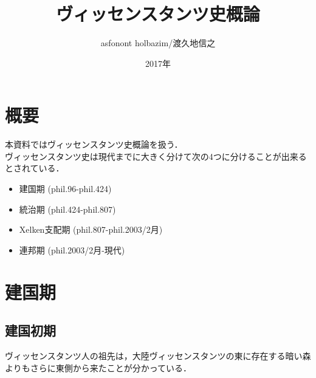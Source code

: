 \documentclass[a4paper,xelatex,ja=standard]{bxjsarticle}
\begin{document}
{
\title{\Huge ヴィッセンスタンツ史概論}
\author{asfonont holbazim/渡久地信之}
\date{2017年}
}
\maketitle
\thispagestyle{empty}


\newpage

\tableofcontents

\newpage
{}

\section{概要}
本資料ではヴィッセンスタンツ史概論を扱う．\\
ヴィッセンスタンツ史は現代までに大きく分けて次の4つに分けることが出来るとされている．
\begin{itemize}
 \item 建国期 (phil.96-phil.424)
 \item 統治期 (phil.424-phil.807)
 \item Xelken支配期 (phil.807-phil.2003/2月)
 \item 連邦期 (phil.2003/2月-現代)
\end{itemize}

\section{建国期}
\subsection{建国初期}
ヴィッセンスタンツ人の祖先は，大陸ヴィッセンスタンツの東に存在する暗い森よりもさらに東側から来たことが分かっている．
\end{document}
